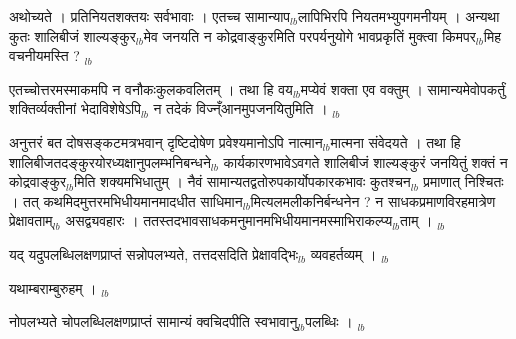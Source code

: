 \documentclass[article,12pt,a4paper]{memoir}%
\newcounter{parCount}
\begin{document}
	  
	  \pstart \leavevmode%
	अथोच्यते । प्रतिनियतशक्तयः सर्व\leavevmode{}भावाः । एतच्च सामान्याप{\tiny $_{lb}$}लापिभिरपि नियतमभ्युपगमनीयम् । अन्यथा कुतः शालिबीजं शाल्यङ्कुर{\tiny $_{lb}$}मेव जनयति न कोद्रवाङ्कुरमिति परपर्यनुयोगे भावप्रकृतिं मुक्त्वा किमपर{\tiny $_{lb}$}मिह वचनीयमस्ति ?
	{}
	\pend%
      {\tiny $_{lb}$}

	  
	  \pstart \leavevmode%
	एतच्चोत्तरमस्माकमपि न वनौकःकुलकवलितम् । तथा हि वय{\tiny $_{lb}$}मप्येवं शक्ता एव वक्तुम् । सामान्यमेवोपकर्तुं शक्तिर्व्यक्तीनां भेदाविशेषेऽपि{\tiny $_{lb}$} न तदेकं विज्न्ँआनमुपजनयितुमिति ।
	{}
	\pend%
      {\tiny $_{lb}$}

	  
	  \pstart \leavevmode%
	अनुत्तरं बत दोषसङ्कटमत्रभवान् दृष्टिदोषेण प्रवेश्यमानोऽपि नात्मान{\tiny $_{lb}$}मात्मना संवेदयते । तथा हि शालिबीजतदङ्कुरयोरध्यक्षानुपलम्भनिबन्धने{\tiny $_{lb}$} कार्यकारणभावेऽवगते शालिबीजं शाल्यङ्कुरं जनयितुं शक्तं न कोद्रवाङ्कुर{\tiny $_{lb}$}मिति शक्यमभिधातुम् । नैवं सामान्यतद्वतोरुपकार्योपकारकभावः कुतश्चन{\tiny $_{lb}$} \leavevmode{} प्रमाणात् निश्चितः । तत् कथमिदमुत्तरमभिधीयमानमादधीत साधिमान{\tiny $_{lb}$}मित्यलमलीकनिर्बन्धनेन ? न साधकप्रमाणविरहमात्रेण प्रेक्षावताम्{\tiny $_{lb}$} असद्व्यवहारः । ततस्तदभावसाधकमनुमानमभिधीयमानमस्माभिराकल्प्य{\tiny $_{lb}$}ताम् ।
	{}
	\pend%
      {\tiny $_{lb}$}

	  
	  \pstart \leavevmode%
	यद् यदुपलब्धिलक्षणप्राप्तं सन्नोपलभ्यते, तत्तदसदिति प्रेक्षावद्भिः{\tiny $_{lb}$} व्यवहर्तव्यम् ।
	{}
	\pend%
      {\tiny $_{lb}$}

	  
	  \pstart \leavevmode%
	यथाम्बराम्बुरुहम् ।
	{}
	\pend%
      {\tiny $_{lb}$}

	  
	  \pstart \leavevmode%
	नोपलभ्यते चोपलब्धिलक्षणप्राप्तं सामान्यं क्वचिदपीति स्वभावानु{\tiny $_{lb}$}पलब्धिः ।
	{}
	\pend%
      {\tiny $_{lb}$}
\end{document}
